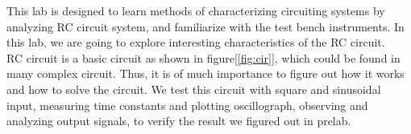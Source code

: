 This lab is designed to learn methods of characterizing circuiting systems by analyzing RC circuit system, and familiarize with the test bench instruments. In this lab, we are going to explore interesting characteristics of the RC circuit. \\
\phantom{ } RC circuit is a basic circuit as shown in figure[\ref{fig:cir}], which could be found in many complex circuit. Thus, it is of much importance to figure out how it works and how to solve the circuit. We test this circuit with square and sinusoidal input, measuring time constants and plotting oscillograph, observing and analyzing output signals, to verify the result we figured out in prelab. 